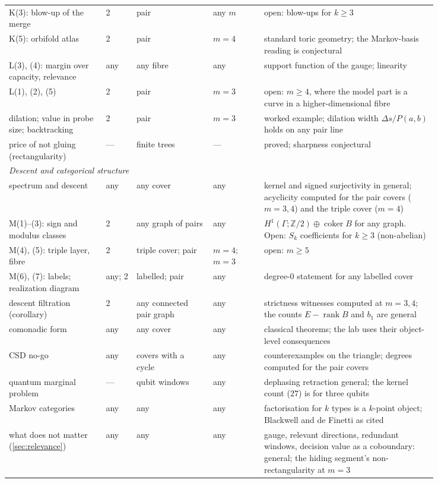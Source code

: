 \documentclass[11pt]{article}
\theoremstyle{definition}\newtheorem{definition}{Definition}\newtheorem{remark}{Remark}
\begin{document}
{\begin{longtable}{p{0.19\linewidth}p{0.06\linewidth}p{0.15\linewidth}p{0.1\linewidth}p{0.34\linewidth}}
K(3): blow-up of the merge & 2 & pair & any $m$ & open: blow-ups for $k\ge3$\\
K(5): orbifold atlas & 2 & pair & $m=4$ & standard toric geometry; the Markov-basis reading is conjectural\\
L(3), (4): margin over capacity, relevance & any & any fibre & any & support function of the gauge; linearity\\
L(1), (2), (5) & 2 & pair & $m=3$ & open: $m\ge4$, where the model part is a curve in a higher-dimensional fibre\\
dilation; value in probe size; backtracking & 2 & pair & $m=3$ & worked example; dilation width $\Delta s/P(a,b)$ holds on any pair line\\
price of not gluing (rectangularity) & --- & finite trees & --- & proved; sharpness conjectural\\[3pt]
\multicolumn{5}{l}{\emph{Descent and categorical structure}}\\*
spectrum and descent & any & any cover & any & kernel and signed surjectivity in general; acyclicity computed for the pair covers ($m=3,4$) and the triple cover ($m=4$)\\
M(1)--(3): sign and modulus classes & 2 & any graph of pairs & any & $H^1(\Gamma;\mathbb Z/2)\oplus\operatorname{coker}B$ for any graph. Open: $S_k$ coefficients for $k\ge3$ (non-abelian)\\
M(4), (5): triple layer, fibre & 2 & triple cover; pair & $m=4$; $m=3$ & open: $m\ge5$\\
M(6), (7): labels; realization diagram & any; 2 & labelled; pair & any & degree-$0$ statement for any labelled cover\\
descent filtration (corollary) & 2 & any connected pair graph & any & strictness witnesses computed at $m=3,4$; the counts $E-\operatorname{rank}B$ and $b_1$ are general\\
comonadic form & any & any cover & any & classical theorems; the lab uses their object-level consequences\\
CSD no-go & any & covers with a cycle & any & counterexamples on the triangle; degrees computed for the pair covers\\
quantum marginal problem & --- & qubit windows & any & dephasing retraction general; the kernel count ($27$) is for three qubits\\
Markov categories & any & any & any & factorisation for $k$ types is a $k$-point object; Blackwell and de Finetti as cited\\
what does not matter (\cref{sec:relevance}) & any & any & any & gauge, relevant directions, redundant windows, decision value as a coboundary: general; the hiding segment's non-rectangularity at $m=3$\\

\end{longtable}}
\end{document}
